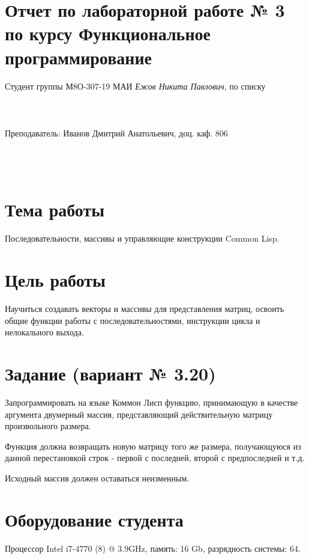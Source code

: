 \documentclass[12pt]{article}
\begin{document}
\section*{Отчет по лабораторной работе № 3 \\
по курсу \guillemotleft Функциональное программирование\guillemotright}
\begin{flushright}
Студент группы М8О-307-19 МАИ \textit{Ежов Никита Павлович},  по списку \\
 \\
 \\
\ \\
Преподаватель: Иванов Дмитрий Анатольевич, доц. каф. 806 \\
 \\
 \\
 \\

\end{flushright}

\section{Тема работы}
Последовательности, массивы и управляющие конструкции Common Lisp.

\section{Цель работы}
Научиться создавать векторы и массивы для представления матриц, освоить общие функции работы с последовательностями, инструкции цикла и нелокального выхода.

\section{Задание (вариант № 3.20)}
Запрограммировать на языке Коммон Лисп функцию, принимающую в качестве аргумента двумерный массив, представляющий действительную матрицу произвольного размера.

Функция должна возвращать новую матрицу того же размера, получающуюся из данной перестановкой строк - первой с последней, второй с предпоследней и т.д.

Исходный массив должен оставаться неизменным.

\section{Оборудование студента}
Процессор Intel i7-4770 (8) @ 3.9GHz, память: 16 Gb, разрядность системы: 64.
\end{document}
